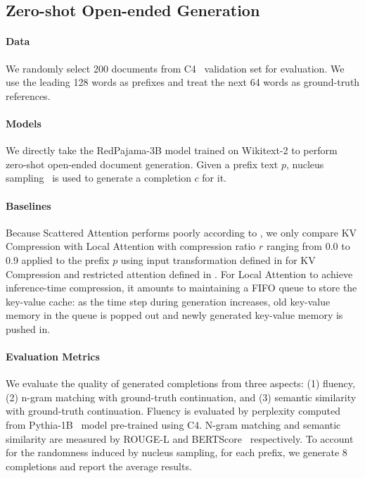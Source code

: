 \subsection{Zero-shot Open-ended Generation}
\label{sec:open}
\paragraph{Data} We randomly select 200 documents from C4~\cite{t5} validation set for evaluation. We use the leading 128 words as prefixes and treat the next 64 words as ground-truth references.
\paragraph{Models} We directly take the RedPajama-3B model trained on Wikitext-2 to perform zero-shot open-ended document generation. Given a prefix text $p$, nucleus sampling~\cite{topp} is used to generate a completion $c$ for it.
\paragraph{Baselines} Because Scattered Attention performs poorly according to , we only compare KV Compression with Local Attention with compression ratio $r$ ranging from 0.0 to 0.9 applied to the prefix $p$ using input transformation defined in  for KV Compression and restricted attention defined in . For Local Attention to achieve inference-time compression, it amounts to maintaining a FIFO queue to store the key-value cache: as the time step during generation increases, old key-value memory in the queue is popped out and newly generated key-value memory is pushed in.
\paragraph{Evaluation Metrics} We evaluate the quality of generated completions from three aspects: (1) fluency, (2) n-gram matching with ground-truth continuation, and (3) semantic similarity with ground-truth continuation. Fluency is evaluated by perplexity computed from Pythia-1B~\cite{pythia} model pre-trained using C4. N-gram matching and semantic similarity are measured by ROUGE-L and BERTScore~\cite{bertscore} respectively. To account for the randomness induced by nucleus sampling, for each prefix, we generate 8 completions and report the average results.
